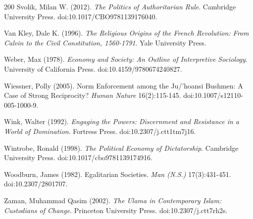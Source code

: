 \documentclass[11pt,letterpaper]{article}
\theoremstyle{definition}
\theoremstyle{remark}
\begin{document}
\begin{thebibliography}{200}
Svolik, Milan W. (2012). \emph{The Politics of Authoritarian Rule}. Cambridge University Press. doi:10.1017/CBO9781139176040.

Van Kley, Dale K. (1996). \emph{The Religious Origins of the French Revolution: From Calvin to the Civil Constitution, 1560-1791}. Yale University Press.

Weber, Max (1978). \emph{Economy and Society: An Outline of Interpretive Sociology}. University of California Press. doi:10.4159/9780674240827.

Wiessner, Polly (2005). Norm Enforcement among the Ju/'hoansi Bushmen: A Case of Strong Reciprocity? \emph{Human Nature} 16(2):115-145. doi:10.1007/s12110-005-1000-9.

Wink, Walter (1992). \emph{Engaging the Powers: Discernment and Resistance in a World of Domination}. Fortress Press. doi:10.2307/j.ctt1tm7j16.

Wintrobe, Ronald (1998). \emph{The Political Economy of Dictatorship}. Cambridge University Press. doi:10.1017/cbo9781139174916.

Woodburn, James (1982). Egalitarian Societies. \emph{Man (N.S.)} 17(3):431-451. doi:10.2307/2801707.

Zaman, Muhammad Qasim (2002). \emph{The Ulama in Contemporary Islam: Custodians of Change}. Princeton University Press. doi:10.2307/j.ctt7rh2s.

\end{thebibliography}
\end{document}
